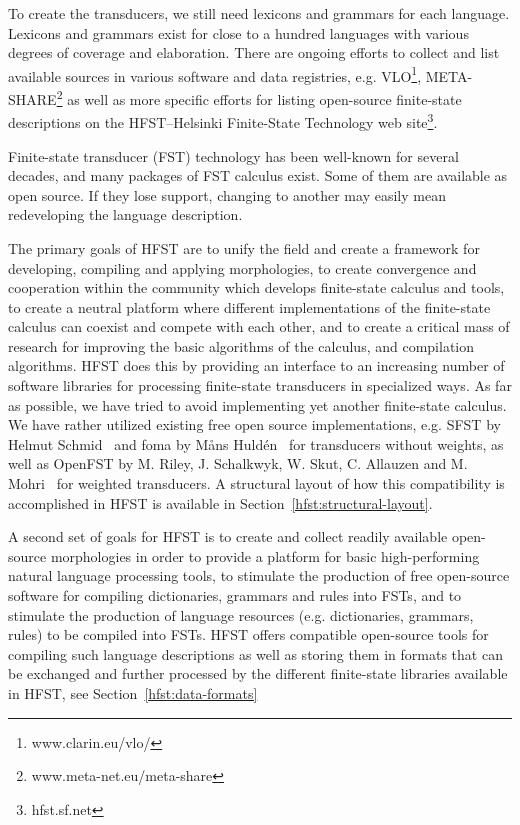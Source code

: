 \documentclass{llncs}
\begin{document}
To create the transducers, we still need lexicons and grammars for each language.
Lexicons and grammars exist for close to a hundred languages with various degrees 
of coverage and elaboration. There are ongoing efforts to collect and list available 
sources in various software and data registries, e.g. VLO\footnote{www.clarin.eu/vlo/}, 
META-SHARE\footnote{www.meta-net.eu/meta-share} as well as more specific
efforts for listing open-source finite-state descriptions on the 
HFST--Helsinki Finite-State Technology web site\footnote{hfst.sf.net}.


Finite-state transducer (FST) technology has been well-known for several 
decades, and many packages of FST calculus exist. Some of them are 
available as open source. If they lose support, changing to another may
easily mean redeveloping the language description. 

The primary goals of HFST are to unify the field and create a framework for developing, 
compiling and applying morphologies, to create convergence and cooperation within the
community which develops finite-state calculus and tools, to create a neutral platform 
where different implementations of the finite-state calculus can coexist and compete 
with each other, and to create a critical mass of research for improving the basic algorithms 
of the calculus, and compilation algorithms.  
HFST does this by providing an interface to an increasing number of software libraries 
for processing finite-state transducers in specialized ways. As far as possible, 
we have tried to avoid implementing yet another finite-state calculus. We have 
rather utilized existing free open source implementations, e.g. SFST by Helmut 
Schmid~\cite{schmid/2005} and foma by Måns Huldén~\cite{hulden/2009} 
for transducers without weights, as well as OpenFST  by M. Riley, J. Schalkwyk, W. Skut, 
C. Allauzen and M. Mohri~\cite{openfst/2007} for weighted transducers. A structural 
layout of how this compatibility is accomplished in HFST is available in Section~\ref{hfst:structural-layout}.

A second set of goals for HFST is to create and collect  
readily available open-source morphologies in order to provide a platform for basic 
high-performing natural language processing tools, to stimulate the production of free 
open-source software for compiling dictionaries, grammars and rules into FSTs, and to 
stimulate the production of language resources (e.g. dictionaries, grammars, rules) to 
be compiled into FSTs. 
HFST offers compatible open-source tools 
for compiling such language descriptions as well as storing them 
in formats that can be exchanged and further processed by the different finite-state libraries 
available in HFST, see Section~\ref{hfst:data-formats}
\end{document}
